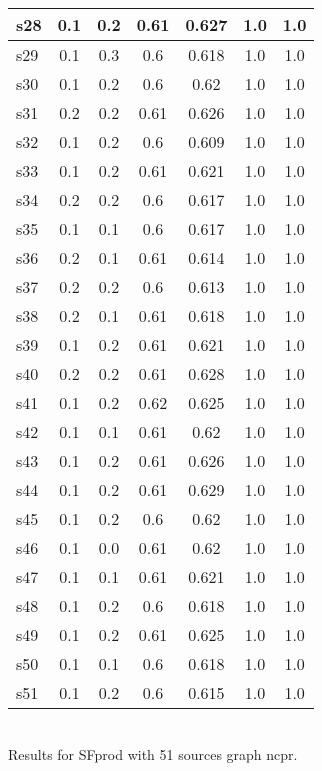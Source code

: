 \documentclass{article}
\begin{document}
\begin{tabular}{|l|c|c|c|c|c|c|}
\hline
s28 &0.1 & 0.2 & 0.61 & 0.627 & 1.0 & 1.0\\
\hline
s29 &0.1 & 0.3 & 0.6 & 0.618 & 1.0 & 1.0\\
\hline
s30 &0.1 & 0.2 & 0.6 & 0.62 & 1.0 & 1.0\\
\hline
s31 &0.2 & 0.2 & 0.61 & 0.626 & 1.0 & 1.0\\
\hline
s32 &0.1 & 0.2 & 0.6 & 0.609 & 1.0 & 1.0\\
\hline
s33 &0.1 & 0.2 & 0.61 & 0.621 & 1.0 & 1.0\\
\hline
s34 &0.2 & 0.2 & 0.6 & 0.617 & 1.0 & 1.0\\
\hline
s35 &0.1 & 0.1 & 0.6 & 0.617 & 1.0 & 1.0\\
\hline
s36 &0.2 & 0.1 & 0.61 & 0.614 & 1.0 & 1.0\\
\hline
s37 &0.2 & 0.2 & 0.6 & 0.613 & 1.0 & 1.0\\
\hline
s38 &0.2 & 0.1 & 0.61 & 0.618 & 1.0 & 1.0\\
\hline
s39 &0.1 & 0.2 & 0.61 & 0.621 & 1.0 & 1.0\\
\hline
s40 &0.2 & 0.2 & 0.61 & 0.628 & 1.0 & 1.0\\
\hline
s41 &0.1 & 0.2 & 0.62 & 0.625 & 1.0 & 1.0\\
\hline
s42 &0.1 & 0.1 & 0.61 & 0.62 & 1.0 & 1.0\\
\hline
s43 &0.1 & 0.2 & 0.61 & 0.626 & 1.0 & 1.0\\
\hline
s44 &0.1 & 0.2 & 0.61 & 0.629 & 1.0 & 1.0\\
\hline
s45 &0.1 & 0.2 & 0.6 & 0.62 & 1.0 & 1.0\\
\hline
s46 &0.1 & 0.0 & 0.61 & 0.62 & 1.0 & 1.0\\
\hline
s47 &0.1 & 0.1 & 0.61 & 0.621 & 1.0 & 1.0\\
\hline
s48 &0.1 & 0.2 & 0.6 & 0.618 & 1.0 & 1.0\\
\hline
s49 &0.1 & 0.2 & 0.61 & 0.625 & 1.0 & 1.0\\
\hline
s50 &0.1 & 0.1 & 0.6 & 0.618 & 1.0 & 1.0\\
\hline
s51 &0.1 & 0.2 & 0.6 & 0.615 & 1.0 & 1.0\\
\hline
\end{tabular}\\

\noindent Results for SFprod with 51 sources graph ncpr.
\end{document}
